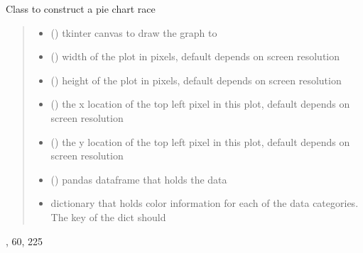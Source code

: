 \documentclass[letterpaper,10pt,english]{sphinxmanual}
\begin{document}
\begin{fulllineitems}
\sphinxAtStartPar
Class to construct a pie chart race
\begin{quote}\begin{description}
\begin{itemize}
\item {} 
\sphinxAtStartPar
{} () \textendash{} tkinter canvas to draw the graph to

\item {} 
\sphinxAtStartPar
{} () \textendash{} width of the plot in pixels, default depends on screen resolution

\item {} 
\sphinxAtStartPar
{} () \textendash{} height of the plot in pixels, default depends on screen resolution

\item {} 
\sphinxAtStartPar
{} () \textendash{} the x location of the top left pixel in this plot, default depends on screen resolution

\item {} 
\sphinxAtStartPar
{} () \textendash{} the y location of the top left pixel in this plot, default depends on screen resolution

\item {} 
\sphinxAtStartPar
{} () \textendash{} pandas dataframe that holds the data

\item {} 
\sphinxAtStartPar
{} \textendash{} dictionary that holds color information for each of the data categories. The key of the dict should

\end{itemize}

\end{description}\end{quote}
\begin{description}
\begin{description}
\sphinxlineitem{\{}\begin{description}
\sphinxlineitem{“United States”: {[}}
,
60,
225


\end{description}
\end{description}
\end{description}
\end{fulllineitems}
\end{document}
